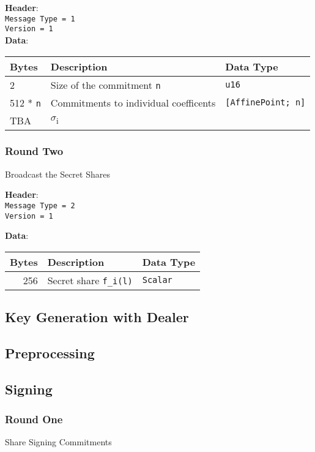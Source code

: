 \documentclass[11pt]{article}
\begin{document}
\noindent
\textbf{Header}:\\
\texttt{Message Type = 1}\\
\texttt{Version = 1}\\

\noindent
\textbf{Data}:
\begin{center}
\begin{tabular}{lll}
Bytes & Description & Data Type\\
\hline
2 & Size of the commitment \texttt{n} & \texttt{u16}\\
512 * \texttt{n} & Commitments to individual coefficents & \texttt{[AffinePoint; n]}\\
TBA & \(\sigma\)\textsubscript{i} & \\
\end{tabular}
\end{center}

\subsubsection{Round Two}
\label{sec:org102acd0}
Broadcast the Secret Shares

\textbf{Header}:\\
\texttt{Message Type = 2}\\
\texttt{Version = 1}

\textbf{Data}:
\begin{center}
\begin{tabular}{rll}
Bytes & Description & Data Type\\
\hline
256 & Secret share \texttt{f\_i(l)} & \texttt{Scalar}\\
\end{tabular}
\end{center}


\subsection{Key Generation with Dealer}
\label{sec:org3e95d94}

\subsection{Preprocessing}
\label{sec:org50994f9}

\subsection{Signing}
\label{sec:orged00f32}

\subsubsection{Round One}
\label{sec:org955198c}
Share Signing Commitments
\end{document}
